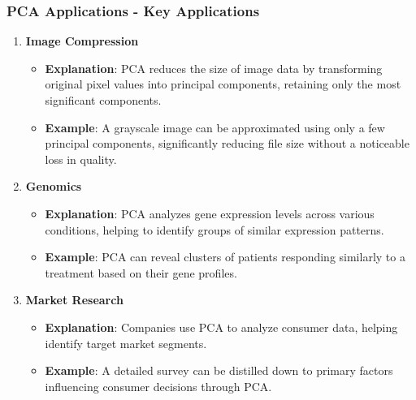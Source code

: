 \documentclass[aspectratio=169]{beamer}
\begin{document}
\begin{frame}[fragile]
    \frametitle{PCA Applications - Key Applications}
    \begin{enumerate}
        \item \textbf{Image Compression}  
        \begin{itemize}
            \item \textbf{Explanation}: PCA reduces the size of image data by transforming original pixel values into principal components, retaining only the most significant components.
            \item \textbf{Example}: A grayscale image can be approximated using only a few principal components, significantly reducing file size without a noticeable loss in quality.
        \end{itemize}
        
        \item \textbf{Genomics}  
        \begin{itemize}
            \item \textbf{Explanation}: PCA analyzes gene expression levels across various conditions, helping to identify groups of similar expression patterns.
            \item \textbf{Example}: PCA can reveal clusters of patients responding similarly to a treatment based on their gene profiles.
        \end{itemize}

        \item \textbf{Market Research}  
        \begin{itemize}
            \item \textbf{Explanation}: Companies use PCA to analyze consumer data, helping identify target market segments.
            \item \textbf{Example}: A detailed survey can be distilled down to primary factors influencing consumer decisions through PCA.
        \end{itemize}
    \end{enumerate}
\end{frame}
\end{document}
